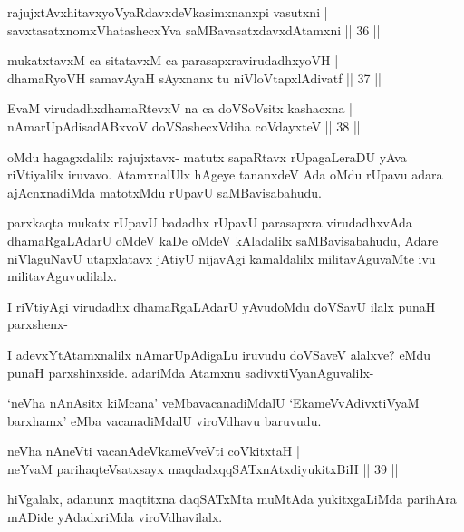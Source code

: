 \begin{shl}
rajujxtAvxhitavxyoVyaRdavxdeVkasimxnanxpi vasutxni |\\
savxtasatxnomxVhatashecxYva saMBavasatxdavxdAtamxni \hfill || 36 ||
\end{shl}

\begin{shl}
mukatxtavxM ca sitatavxM ca parasapxravirudadhxyoVH |\\
dhamaRyoVH samavAyaH sAyxnanx tu niVloVtapxlAdivatf \hfill || 37 ||
\end{shl}

\begin{shl}
EvaM virudadhxdhamaRtevxV na ca doVSoV\s sitx kashacxna |\\
nAmarUpAdisadABxvoV doVSashecxVdiha coVdayxteV \hfill || 38 ||
\end{shl}

\begin{artha}
oMdu hagagxdalilx rajujxtavx- matutx sapaRtavx rUpagaLeraDU yAva riVtiyalilx iruvavo. AtamxnalUlx hAgeye tananxdeV Ada oMdu rUpavu adara ajAcnxnadiMda matotxMdu rUpavU saMBavisabahudu.

parxkaqta mukatx rUpavU badadhx rUpavU parasapxra virudadhxvAda dhamaRgaLAdarU oMdeV kaDe oMdeV kAladalilx saMBavisabahudu, Adare niVlaguNavU utapxlatavx jAtiyU nijavAgi kamaldalilx militavAguvaMte ivu militavAguvudilalx.

I riVtiyAgi virudadhx dhamaRgaLAdarU yAvudoMdu doVSavU ilalx punaH parxshenx-

I adevxYtAtamxnalilx nAmarUpAdigaLu iruvudu doVSaveV alalxve? eMdu punaH parxshinxside. adariMda Atamxnu sadivxtiVyanAguvalilx-
\end{artha}%

\begin{artha}
`neVha nAnAsitx kiMcana' veMbavacanadiMdalU `EkameVvAdivxtiVyaM barxhamx' eMba vacanadiMdalU viroVdhavu baruvudu.
\end{artha}


\begin{shl}
neVha nAneVti vacanAdeVkameVveVti coVkitxtaH |\\
neYvaM parihaqteVsatxsayx maqdadxqqSATxnAtxdiyukitxBiH \hfill || 39 ||
\end{shl}

\begin{artha}
hiVgalalx, adanunx maqtitxna daqSATxMta muMtAda yukitxgaLiMda parihAra mADide yAdadxriMda viroVdhavilalx.
\end{artha}

